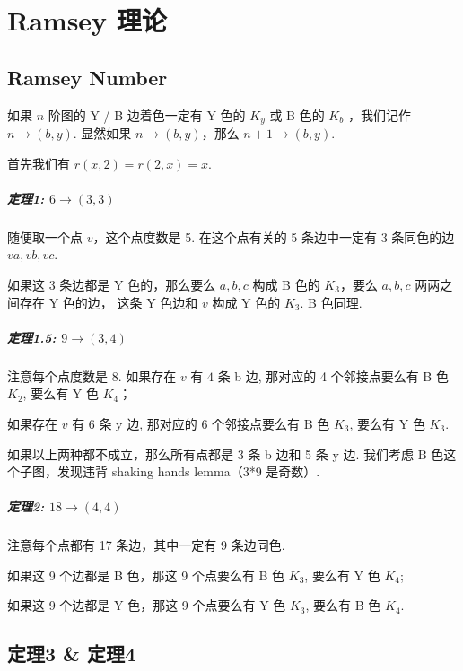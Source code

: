 \chapter{Ramsey 理论}
\label{ch:250421}

\section{Ramsey Number}

如果 $n$ 阶图的 Y / B 边着色一定有 Y 色的 $K_y$ 或 B 色的 $K_b$ ，我们记作 $n\to(b,y)$. 
显然如果 $n\to(b,y)$，那么 $n+1\to(b,y)$.

首先我们有 $r(x,2)=r(2,x)=x$.

\paragraph*{定理1: $6\to(3,3)$}

随便取一个点 $v$，这个点度数是 5. 在这个点有关的 5 条边中一定有 3 条同色的边 $va,vb,vc$.

如果这 3 条边都是 Y 色的，那么要么 $a,b,c$ 构成 B 色的 $K_3$，要么 $a,b,c$ 两两之间存在 Y 色的边，
这条 Y 色边和 $v$ 构成 Y 色的 $K_3$.  B 色同理.

\paragraph*{定理1.5: $9\to(3,4)$}

注意每个点度数是 $8$. 如果存在 $v$ 有 $4$ 条 b 边, 那对应的 4 个邻接点要么有 B 色 $K_2$, 要么有 Y 色 $K_4$；

如果存在 $v$ 有 6 条 y 边, 那对应的 $6$ 个邻接点要么有 B 色 $K_3$, 要么有 Y 色 $K_3$.

如果以上两种都不成立，那么所有点都是 3 条 b 边和 5 条 y 边. 
我们考虑 B 色这个子图，发现违背 shaking hands lemma（3*9 是奇数）.

\paragraph*{定理2: $18\to(4,4)$}

注意每个点都有 17 条边，其中一定有 9 条边同色.

如果这 9 个边都是 B 色，那这 9 个点要么有 B 色 $K_3$, 要么有 Y 色 $K_4$;

如果这 9 个边都是 Y 色，那这 9 个点要么有 Y 色 $K_3$, 要么有 B 色 $K_4$.

\section{定理3 \& 定理4}

